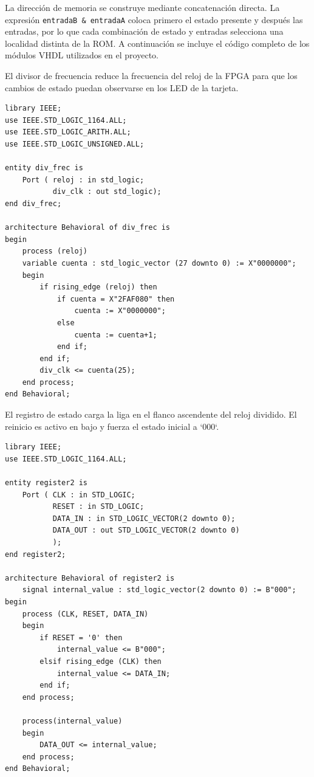 \documentclass[12pt, letterpaper]{article}
\begin{document}
La dirección de memoria se construye mediante concatenación directa. La expresión \texttt{entradaB \& entradaA} coloca primero el estado presente y después las entradas, por lo que cada combinación de estado y entradas selecciona una localidad distinta de la ROM. A continuación se incluye el código completo de los módulos VHDL utilizados en el proyecto.

El divisor de frecuencia reduce la frecuencia del reloj de la FPGA para que los cambios de estado puedan observarse en los LED de la tarjeta.

\begin{lstlisting}[style=vhdl, caption={Código completo del divisor de frecuencia.}, label={lst:div_frec}]
library IEEE;
use IEEE.STD_LOGIC_1164.ALL;
use IEEE.STD_LOGIC_ARITH.ALL;
use IEEE.STD_LOGIC_UNSIGNED.ALL;

entity div_frec is
    Port ( reloj : in std_logic;
           div_clk : out std_logic);
end div_frec;

architecture Behavioral of div_frec is
begin
    process (reloj)
    variable cuenta : std_logic_vector (27 downto 0) := X"0000000";
    begin
        if rising_edge (reloj) then
            if cuenta = X"2FAF080" then
                cuenta := X"0000000";
            else
                cuenta := cuenta+1;
            end if;
        end if;
        div_clk <= cuenta(25);
    end process;
end Behavioral;
\end{lstlisting}

El registro de estado carga la liga en el flanco ascendente del reloj dividido. El reinicio es activo en bajo y fuerza el estado inicial a `000`.

\begin{lstlisting}[style=vhdl, caption={Código completo del registro de estado.}, label={lst:register2}]
library IEEE;
use IEEE.STD_LOGIC_1164.ALL;

entity register2 is
    Port ( CLK : in STD_LOGIC;
           RESET : in STD_LOGIC;
           DATA_IN : in STD_LOGIC_VECTOR(2 downto 0);
           DATA_OUT : out STD_LOGIC_VECTOR(2 downto 0)
           );
end register2;

architecture Behavioral of register2 is
    signal internal_value : std_logic_vector(2 downto 0) := B"000";
begin
    process (CLK, RESET, DATA_IN)
    begin
        if RESET = '0' then
            internal_value <= B"000";
        elsif rising_edge (CLK) then
            internal_value <= DATA_IN;
        end if;
    end process;

    process(internal_value)
    begin
        DATA_OUT <= internal_value;
    end process;
end Behavioral;
\end{lstlisting}
\end{document}
